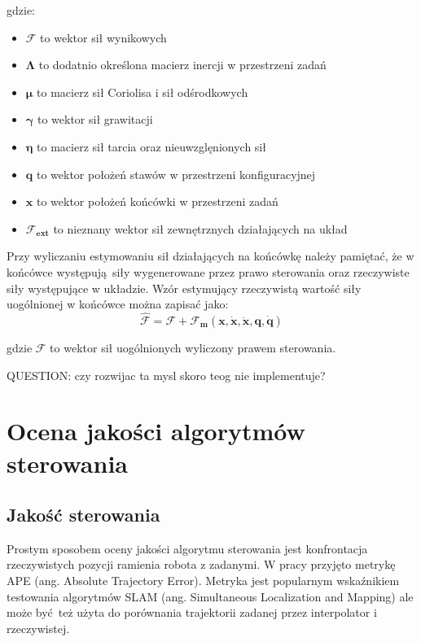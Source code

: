 gdzie:
\begin{itemize}
	\item $\boldsymbol{\mathcal{F}}$ to wektor sił wynikowych
	\item $\boldsymbol{\Lambda}$ to dodatnio określona macierz inercji w przestrzeni zadań
	\item $\boldsymbol{\mu}$ to macierz sił Coriolisa i sił odśrodkowych	
	\item $\boldsymbol{\gamma}$ to wektor sił grawitacji
	\item $\boldsymbol{\eta}$ to macierz sił tarcia oraz nieuwzglęnionych sił
	\item $\boldsymbol{q}$ to wektor położeń stawów w przestrzeni konfiguracyjnej
	\item $\boldsymbol{x}$ to wektor położeń końcówki w przestrzeni zadań
	\item $ \boldsymbol{\mathcal{F}_{ext}}$ to nieznany wektor sił zewnętrznych działających na układ
\end{itemize} 

Przy wyliczaniu estymowaniu sił działających na końcówkę należy pamiętać, że w końcówce występują siły wygenerowane przez prawo sterowania oraz rzeczywiste siły występujące w układzie. Wzór estymujący rzeczywistą wartość siły uogólnionej w końcówce można zapisać jako:
\begin{equation}
\boldsymbol{\mathcal{\hat{F}}} = \boldsymbol{\mathcal{F}} + \boldsymbol{\mathcal{F}_m}(\boldsymbol{x}, \dot{\boldsymbol{x}}, \ddot{\boldsymbol{x}}, \boldsymbol{q}, \dot{\boldsymbol{q}})
\end{equation}

gdzie $\boldsymbol{\mathcal{F}}$ to wektor sił uogólnionych wyliczony prawem sterowania.

QUESTION: czy rozwijac ta mysl skoro teog nie implementuje?

\section{Ocena jakości algorytmów sterowania}
\subsection{Jakość sterowania}
\label{chap:ape}
Prostym sposobem oceny jakości algorytmu sterowania jest konfrontacja rzeczywistych pozycji ramienia robota z zadanymi. W pracy przyjęto metrykę APE (ang. Absolute Trajectory Error). Metryka jest popularnym wskaźnikiem testowania algorytmów SLAM (ang. Simultaneous Localization and Mapping) ale może być też użyta do porównania trajektorii zadanej przez interpolator i rzeczywistej. 

